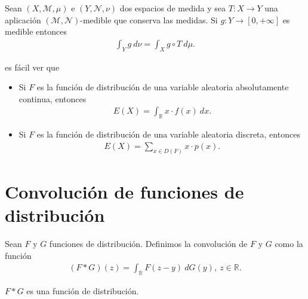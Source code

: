 \begin{teo}
    Sean $(X, \mathcal{M}, \mu)$ e $(Y, \mathcal{N},\nu)$ dos espacios de medida y sea $T: X \longrightarrow Y$ una aplicación $(\mathcal{M},\mathcal{N})$-medible que conserva las medidas. Si $g: Y \longrightarrow [0,+\infty]$ es medible entonces
    \begin{align*}
        \int_{Y}{g \ d\nu} = \int_{X}{g \circ T \ d\mu}.
    \end{align*}
\end{teo}
es fácil ver que
\begin{itemize}
    \item Si $F$ es la función de distribución de una variable aleatoria absolutamente continua, entonces
          \begin{align*}
              E(X) = \int_{\mathbb{R}} x \cdot f(x) \ dx.
          \end{align*}
    \item Si $F$ es la función de distribución de una variable aleatoria discreta, entonces
          \begin{align*}
              E(X) = \sum_{x \in D(F)} x \cdot p(x).
          \end{align*}
\end{itemize}

\section{Convolución de funciones de distribución}

\begin{defi}
    Sean $F$ y $G$ funciones de distribución. Definimos la convolución de $F$ y $G$ como la función
    \begin{align*}
        (F*G)(z) = \int_{\mathbb{R}} F(z-y) \ dG(y), \ z \in \mathbb{R}.
    \end{align*}
\end{defi}

\begin{prop}
    $F*G$ es una función de distribución.
\end{prop}

